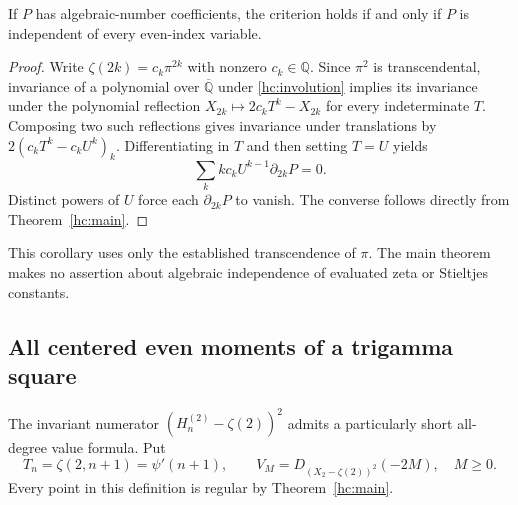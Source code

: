 \begin{corollary}
\label{hc:algebraic}
If $P$ has algebraic-number coefficients, the criterion holds if
and only if $P$ is independent of every even-index variable.
\end{corollary}
\begin{proof}
Write $\zeta(2k)=c_k\pi^{2k}$ with nonzero $c_k\in\mathbb Q$.
Since $\pi^2$ is transcendental, invariance of a polynomial over
$\overline{\mathbb Q}$ under \eqref{hc:involution} implies its
invariance under the polynomial reflection
$X_{2k}\mapsto2c_kT^k-X_{2k}$ for every indeterminate $T$.
Composing two such reflections gives invariance under translations
by $2(c_kT^k-c_kU^k)_k$. Differentiating in $T$ and then setting
$T=U$ yields
\[
             \sum_k k c_k U^{k-1}\partial_{2k}P=0.
\]
Distinct powers of $U$ force each $\partial_{2k}P$ to vanish.
The converse follows directly from Theorem~\ref{hc:main}.
\end{proof}

This corollary uses only the established transcendence of $\pi$.
The main theorem makes no assertion about algebraic independence
of evaluated zeta or Stieltjes constants.

\subsection{All centered even moments of a trigamma square}

The invariant numerator $(H_n^{(2)}-\zeta(2))^2$ admits a particularly
short all-degree value formula. Put
\[
 T_n=\zeta(2,n+1)=\psi'(n+1),\qquad
 V_M=D_{(X_2-\zeta(2))^2}(-2M),\quad M\ge0.
\]
Every point in this definition is regular by Theorem~\ref{hc:main}.

